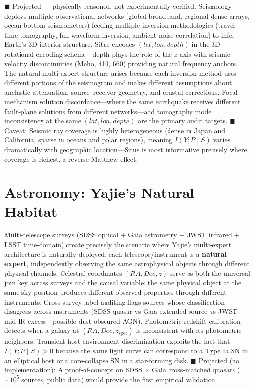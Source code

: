 \documentclass[12pt,a4paper]{article}
\begin{document}
\textcolor{projected}{$\blacksquare$ Projected — physically reasoned, not experimentally verified.}
Seismology deploys multiple observational networks (global broadband, regional dense arrays, ocean-bottom seismometers) feeding multiple inversion methodologies (travel-time tomography, full-waveform inversion\cite{tromp2019}, ambient noise correlation) to infer Earth's 3D interior structure. Situs encodes $(lat,lon,depth)$ in the 3D rotational encoding scheme—depth plays the role of the $z$-axis with seismic velocity discontinuities (Moho, 410, 660\cite{dziewonski1981}) providing natural frequency anchors. The natural multi-expert structure arises because each inversion method uses different portions of the seismogram and makes different assumptions about anelastic attenuation, source--receiver geometry, and crustal corrections. Focal mechanism solution discordance\cite{ekstrom2012}—where the same earthquake receives different fault-plane solutions from different networks—and tomography model inconsistency at the same $(lat,lon,depth)$ are the primary audit targets. \textcolor{warning}{$\blacksquare$ Caveat}: Seismic ray coverage is highly heterogeneous (dense in Japan and California, sparse in oceans and polar regions), meaning $I(Y;P \mid S)$ varies dramatically with geographic location—Situs is most informative precisely where coverage is richest, a reverse-Matthew effect.

\section{Astronomy: Yajie's Natural Habitat}
\label{sec:astronomy}

Multi-telescope surveys (SDSS optical + Gaia astrometry + JWST infrared + LSST time-domain) create precisely the scenario where Yajie's multi-expert architecture is naturally deployed: each telescope/instrument is a \textbf{natural expert}, independently observing the same astrophysical objects through different physical channels. Celestial coordinates $(RA, Dec, z)$ serve as both the universal join key across surveys and the causal variable: the same physical object at the same sky position produces different observed properties through different instruments. Cross-survey label auditing flags sources whose classification disagrees across instruments (SDSS quasar vs Gaia extended source vs JWST mid-IR excess—possible dust-obscured AGN). Photometric redshift calibration detects when a galaxy at $(RA,Dec,z_{\text{spec}})$ is inconsistent with its photometric neighbors. Transient host-environment discrimination exploits the fact that $I(Y;P \mid S) > 0$ because the same light curve can correspond to a Type Ia SN in an elliptical host or a core-collapse SN in a star-forming disk. \textcolor{projected}{$\blacksquare$ Projected (no implementation)}: A proof-of-concept on SDSS $\times$ Gaia cross-matched quasars ($\sim 10^5$ sources, public data) would provide the first empirical validation.
\end{document}
